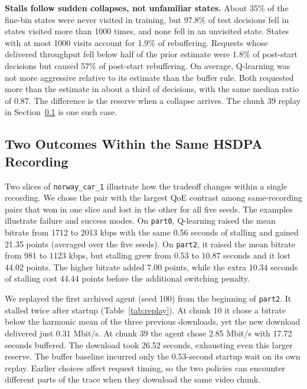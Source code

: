 \documentclass[10pt,letterpaper]{article}
\newif\ifreview
\newcommand{\reviewcolor}{\ifreview\color{reviewred}\fi}
\newenvironment{reviewedit}{\reviewcolor}{}
\begin{document}
\begin{reviewedit}
\textbf{Stalls follow sudden collapses, not unfamiliar states.} About 35\% of
the fine-bin states were never visited in training, but 97.8\% of test decisions fell
in states visited more than 1000 times, and none fell in an unvisited state.
States with at most 1000 visits account for 1.9\% of rebuffering. Requests
whose delivered throughput fell below half of the prior estimate were 1.8\% of
post-start decisions but caused 57\% of post-start rebuffering. On average, Q-learning
was not more aggressive relative to its estimate than the buffer rule. Both
requested more than the estimate in about a third of decisions, with the same
median ratio of 0.87. The difference is the reserve when a collapse arrives.
The chunk 39 replay in Section~\ref{sec:cases} is one such case.

\subsection{Two Outcomes Within the Same HSDPA Recording}
\label{sec:cases}

Two slices of \texttt{norway\_car\_1} illustrate how the tradeoff changes
within a single recording. We chose the pair with the largest QoE contrast
among same-recording pairs that won in one slice and lost in the other for
all five seeds. The examples illustrate failure and success modes.
On \texttt{part0}, Q-learning raised the mean bitrate from 1712 to 2013 kbps
with the same 0.56 seconds of stalling and gained 21.35 points (averaged over
the five seeds). On \texttt{part2}, it raised the mean bitrate from 981 to
1123 kbps, but stalling grew from 0.53 to 10.87 seconds and it lost 44.02
points. The higher bitrate added 7.00 points, while the extra 10.34 seconds of
stalling cost 44.44 points before the additional switching penalty.

We replayed the first archived agent (seed 100) from the beginning of
\texttt{part2}. It stalled twice after startup (Table~\ref{tab:replay}).
At chunk 10 it chose a bitrate below the harmonic mean of the three previous
downloads, yet the new download delivered just 0.31 Mbit/s. At chunk 39
the agent chose 2.85 Mbit/s with 17.72 seconds buffered. The download took
26.52 seconds, exhausting even this larger reserve. The buffer baseline
incurred only the 0.53-second startup wait on its own replay. Earlier
choices affect request timing, so the two policies can encounter different
parts of the trace when they download the same video chunk.


\end{reviewedit}
\end{document}

